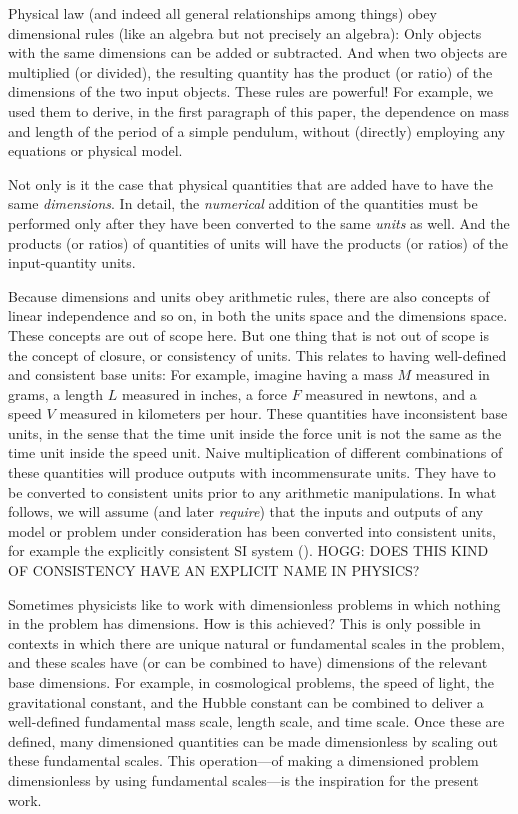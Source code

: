 \documentclass{article}
\begin{document}
Physical law (and indeed all general relationships among things) obey dimensional rules (like an algebra but not precisely an algebra):
Only objects with the same dimensions can be added or subtracted.
And when two objects are multiplied (or divided), the resulting quantity has the product (or ratio) of the dimensions of the two input objects.
These rules are powerful!
For example, we used them to derive, in the first paragraph of this paper, the dependence on mass and length of the period of a simple pendulum, without (directly) employing any equations or physical model.

Not only is it the case that physical quantities that are added have to have the same \emph{dimensions}.
In detail, the \emph{numerical} addition of the quantities must be performed only after they have been converted to the same \emph{units} as well.
And the products (or ratios) of quantities of units will have the products (or ratios) of the input-quantity units.

Because dimensions and units obey arithmetic rules, there are also concepts of linear independence and so on, in both the units space and the dimensions space.
These concepts are out of scope here.
But one thing that is not out of scope is the concept of closure, or consistency of units.
This relates to having well-defined and consistent base units:
For example, imagine having a mass $M$ measured in grams, a length $L$ measured in inches, a force $F$ measured in newtons, and a speed $V$ measured in kilometers per hour. These quantities have inconsistent base units, in the sense that the time unit inside the force unit is not the same as the time unit inside the speed unit.
Naive multiplication of different combinations of these quantities will produce outputs with incommensurate units.
They have to be converted to consistent units prior to any arithmetic manipulations.
In what follows, we will assume (and later \emph{require}) that the inputs and outputs of any model or problem under consideration has been converted into consistent units, for example the explicitly consistent SI system (\cite{si}).
HOGG: DOES THIS KIND OF CONSISTENCY HAVE AN EXPLICIT NAME IN PHYSICS?

Sometimes physicists like to work with dimensionless problems in which nothing in the problem has dimensions.
How is this achieved?
This is only possible in contexts in which there are unique natural or fundamental scales in the problem, and these scales have (or can be combined to have) dimensions of the relevant base dimensions.
For example, in cosmological problems, the speed of light, the gravitational constant, and the Hubble constant can be combined to deliver a well-defined fundamental mass scale, length scale, and time scale.
Once these are defined, many dimensioned quantities can be made dimensionless by scaling out these fundamental scales.
This operation---of making a dimensioned problem dimensionless by using fundamental scales---is the inspiration for the present work.
\end{document}
